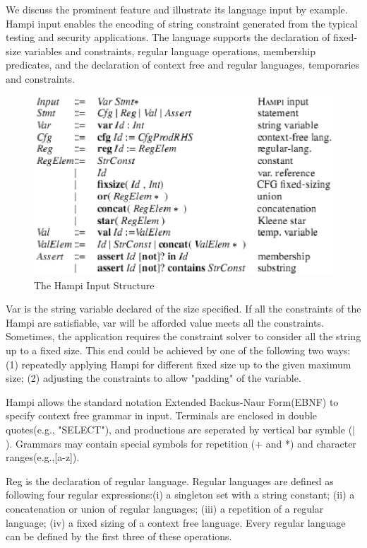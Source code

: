 We discuss the prominent feature and illustrate its language input by example. Hampi input enables the encoding of string constraint generated from the typical testing and security applications. The language supports the declaration of fixed-size variables and constraints, regular language operations, membership predicates, and the declaration of context free and regular languages, temporaries and constraints.

\begin{figure}[h]
\centering
\includegraphics[scale=0.6]{hampiinput.eps} 
\caption{\label{fig:Hampiinput} The Hampi Input Structure}
\end{figure}

Var is the string variable declared of the size specified. If all the constraints of the Hampi are satisfiable, var will be afforded value meets all the constraints. Sometimes, the application requires the constraint solver to consider all the string up to a fixed size. This end could be achieved by one of the following two ways: (1) repeatedly applying Hampi for different fixed size up to the given maximum size; (2) adjusting the constraints to allow "padding" of the variable. 

Hampi allows the standard notation Extended Backus-Naur Form(EBNF) to specify context free grammar in input. Terminals are enclosed in double quotes(e.g., "SELECT"), and productions are seperated by vertical bar symble ($|$). Grammars may contain special symbols for repetition (+ and *) and character ranges(e.g.,[a-z]).

Reg is the declaration of regular language. Regular languages are defined as following four regular expressions:(i) a singleton set with a string constant; (ii) a concatenation or union of regular languages; (iii) a repetition of a regular language; (iv) a fixed sizing of a context free language. Every regular language can be defined by the first three of these operations.  

